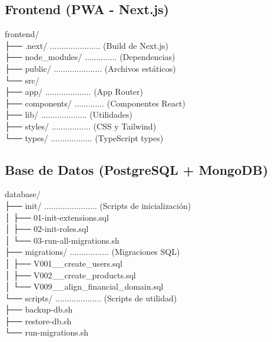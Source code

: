 \documentclass[12pt,a4paper]{article}
\begin{document}
\subsection{Frontend (PWA - Next.js)}
frontend/ \\
├── .next/ ...................... (Build de Next.js) \\
├── node\_modules/ .............. (Dependencias) \\
├── public/ ..................... (Archivos est\'aticos) \\
└── src/ \\
    ├── app/ .................... (App Router) \\
    ├── components/ ............. (Componentes React) \\
    ├── lib/ .................... (Utilidades) \\
    ├── styles/ ................. (CSS y Tailwind) \\
    └── types/ .................. (TypeScript types)

\subsection{Base de Datos (PostgreSQL + MongoDB)}
database/ \\
├── init/ ....................... (Scripts de inicializaci\'on) \\
│   ├── 01-init-extensions.sql \\
│   ├── 02-init-roles.sql \\
│   └── 03-run-all-migrations.sh \\
├── migrations/ ................. (Migraciones SQL) \\
│   ├── V001\_\_create\_users.sql \\
│   ├── V002\_\_create\_products.sql \\
│   └── V009\_\_align\_financial\_domain.sql \\
└── scripts/ .................... (Scripts de utilidad) \\
    ├── backup-db.sh \\
    ├── restore-db.sh \\
    └── run-migrations.sh
\end{document}
